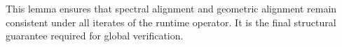 \begin{remark}
This lemma ensures that spectral alignment and geometric alignment remain
consistent under all iterates of the runtime operator.  
It is the final structural guarantee required for global verification.
\end{remark}

